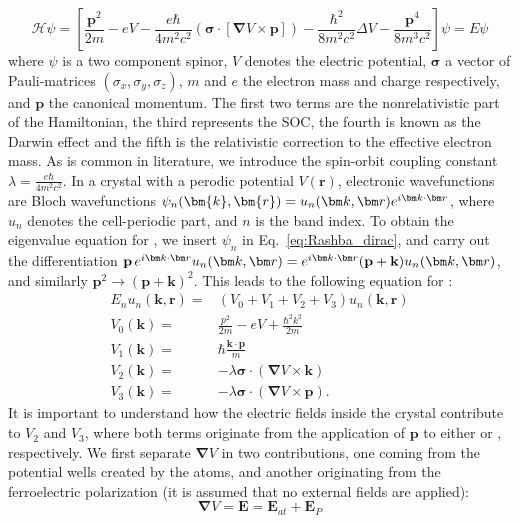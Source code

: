 \begin{equation}
	\label{eq:Rashba_dirac}
	\mathcal{H} \psi = \left[\frac{\bm{p}^2}{2m} - e V - \frac{e \hbar}{4m^2c^2}(\bm{\sigma}\cdot[\bm{\nabla}V \times \bm{p}]) - \frac{\hbar^2}{8m^2c^2} \Delta V - \frac{\bm{p}^4}{8m^3c^2}\right]\psi = E\psi
\end{equation}
where $\psi$ is a two component spinor, $V$ denotes the electric potential, $\bm{\sigma}$ a vector of Pauli-matrices $(\sigma_x, \sigma_y, \sigma_z)$, $m$ and $e$ the electron mass and charge respectively, and $\bm{p}$ the canonical momentum. The first two terms are the nonrelativistic part of the Hamiltonian, the third represents the SOC, the fourth is known as the Darwin effect and the fifth is the relativistic correction to the effective electron mass. 
As is common in literature, we introduce the spin-orbit coupling constant $\lambda = \frac{e \hbar}{4m^2c^2}$.
In a crystal with a perodic potential $V(\mathbf{r})$, electronic wavefunctions are Bloch wavefunctions $\psi_n(\bm{k}, \bm{r}) = \Unkr \Eikr$, where $u_n$ denotes the cell-periodic part, and $n$ is the band index.
To obtain the eigenvalue equation for \unkr, we insert $\psi_n$ in Eq.~\ref{eq:Rashba_dirac}, and carry out the differentiation $\mathbf{p} \, \Eikr\Unkr = \Eikr(\mathbf{p} + \mathbf{k})\Unkr$, and similarly $\mathbf{p}^2 \rightarrow (\mathbf{p}+\mathbf{k})^2$. This leads to the following equation for \unkr:
\begin{align}
	\label{eq:Rashba_unk_Vs}
	E_n u_n(\bm{k}, \bm{r}) =& \left(V_0 + V_1  +  V_2 + V_3 \right) u_n(\bm{k}, \bm{r}) \\
	V_0(\bm{k}) =& \frac{p^2}{2m} - eV + \frac{\hbar^2 k^2}{2m} \\
	V_1(\bm{k}) =& \hbar\frac{\bm{k}\cdot\bm{p}}{m} \\
	V_2(\bm{k}) =& -\lambda \bm{\sigma} \cdot ( \bm{\nabla}V \times \bm{k}) \\
	V_3(\bm{k}) =& -\lambda \bm{\sigma} \cdot ( \bm{\nabla}V \times \bm{p}).
\end{align}
It is important to understand how the electric fields inside the crystal contribute to $V_2$ and $V_3$, where both terms originate from the application of $\bm{p}$ to either \unkr or \eikr, respectively.
We first separate $\bm{\nabla}V$ in two contributions, one coming from the potential wells created by the atoms, and another originating from the ferroelectric polarization (it is assumed that no external fields are applied):
\begin{equation}
	\bm{\nabla} V = \bm{E} = \bm{E}_{at} + \bm{E}_{P}
\end{equation}
